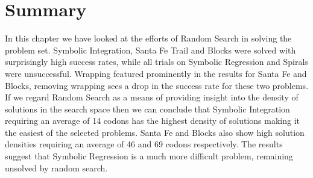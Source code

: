 \section{Summary}
In this chapter we have looked at the efforts of Random Search in solving the problem set. Symbolic Integration, Santa Fe Trail and Blocks were solved with surprisingly high success rates, while all trials on Symbolic Regression and Spirals were unsuccessful. Wrapping featured prominently in the results for Santa Fe and Blocks, removing wrapping sees a drop in the success rate for these two problems. If we regard Random Search as a means of providing insight into the density of solutions in the search space then we can conclude that Symbolic Integration requiring an average of 14 codons has the highest density of solutions making it the easiest of the selected problems. Santa Fe and Blocks also show high solution densities requiring an average of 46 and 69 codons respectively. The results suggest that Symbolic Regression is a much more difficult problem, remaining unsolved by random search.





























